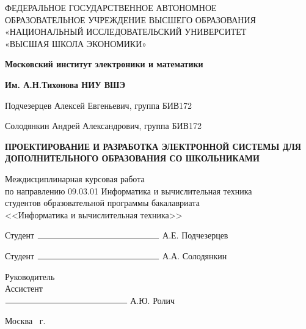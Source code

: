 \begin{titlepage}
	\begin{center}
		ФЕДЕРАЛЬНОЕ  ГОСУДАРСТВЕННОЕ АВТОНОМНОЕ \\
		ОБРАЗОВАТЕЛЬНОЕ УЧРЕЖДЕНИЕ ВЫСШЕГО ОБРАЗОВАНИЯ\\
		«НАЦИОНАЛЬНЫЙ ИССЛЕДОВАТЕЛЬСКИЙ УНИВЕРСИТЕТ\\
		«ВЫСШАЯ ШКОЛА ЭКОНОМИКИ»
	\end{center}
	
	\begin{center}
		\textbf{Московский институт электроники и математики}
		
		\textbf{Им. А.Н.Тихонова НИУ ВШЭ}
	\end{center}
	\vspace{1ex}	
	\begin{center}
		Подчезерцев Алексей Евгеньевич, группа БИВ172
		
		Солодянкин Андрей Александрович, группа БИВ172
	\end{center}	
	\vspace{1ex}
	\begin{center}
		\textbf{ПРОЕКТИРОВАНИЕ И РАЗРАБОТКА ЭЛЕКТРОННОЙ СИСТЕМЫ ДЛЯ ДОПОЛНИТЕЛЬНОГО ОБРАЗОВАНИЯ СО ШКОЛЬНИКАМИ}
	\end{center}	
	\vspace{2ex}
	\begin{center}
		Междисциплинарная курсовая работа \\
		по направлению 09.03.01 Информатика и вычислительная техника \\
		студентов образовательной программы бакалавриата \\
		<<Информатика и вычислительная техника>> \\

	\end{center}
	\vspace{2ex}
	\begin{flushright}
		Студент $\rule{5cm}{0.15mm}$ А.Е. Подчезерцев 
		
		\vspace{1ex}
		Студент $\rule{5cm}{0.15mm}$ А.А. Солодянкин 
	\end{flushright}
	\vspace{3ex}
	\begin{flushright}
		Руководитель\\
		Ассистент \\
		$\rule{5cm}{0.15mm}$ А.Ю. Ролич
	\end{flushright}
	\vfill
	\begin{center}
		Москва \the\year \, г.
	\end{center}
\end{titlepage}